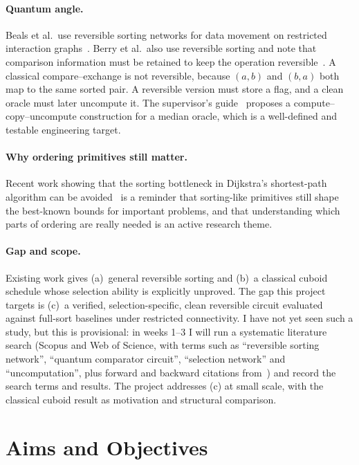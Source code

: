 \documentclass[11pt,a4paper]{article}
\begin{document}
\paragraph{Quantum angle.}
Beals et al.\ use reversible sorting networks for data movement on restricted interaction graphs~\cite{beals}. Berry et al.\ also use reversible sorting and note that comparison information must be retained to keep the operation reversible~\cite{berry}. A classical compare--exchange is not reversible, because $(a,b)$ and $(b,a)$ both map to the same sorted pair. A reversible version must store a flag, and a clean oracle must later uncompute it. The supervisor's guide~\cite{guide} proposes a compute--copy--uncompute construction for a median oracle, which is a well-defined and testable engineering target.

\paragraph{Why ordering primitives still matter.}
Recent work showing that the sorting bottleneck in Dijkstra's shortest-path algorithm can be avoided~\cite{sssp} is a reminder that sorting-like primitives still shape the best-known bounds for important problems, and that understanding which parts of ordering are really needed is an active research theme.

\paragraph{Gap and scope.}
Existing work gives (a)~general reversible sorting and (b)~a classical cuboid schedule whose selection ability is explicitly unproved. The gap this project targets is (c)~a verified, selection-specific, clean reversible circuit evaluated against full-sort baselines under restricted connectivity. I have not yet seen such a study, but this is provisional: in weeks 1--3 I will run a systematic literature search (Scopus and Web of Science, with terms such as ``reversible sorting network'', ``quantum comparator circuit'', ``selection network'' and ``uncomputation'', plus forward and backward citations from~\cite{beals,berry}) and record the search terms and results. The project addresses (c) at small scale, with the classical cuboid result as motivation and structural comparison.

\section{Aims and Objectives}
\end{document}
